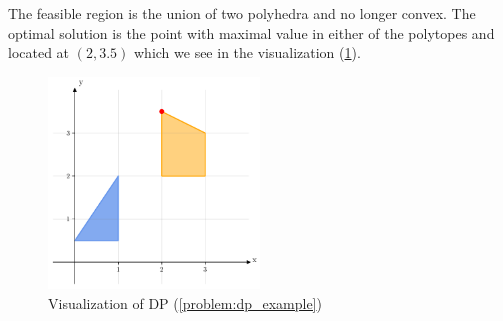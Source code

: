 The feasible region is the union of two polyhedra and no longer convex. The optimal solution is the point with maximal value in either of the polytopes and located at $(2, 3.5)$ which we see in the visualization (\cref{fig:dp}). 

\begin{figure}[h!]
    \centering
    \includegraphics[width=0.5\textwidth]{Images/dp.pdf}
    \caption{Visualization of DP (\cref{problem:dp_example})}
    \label{fig:dp}
\end{figure}


